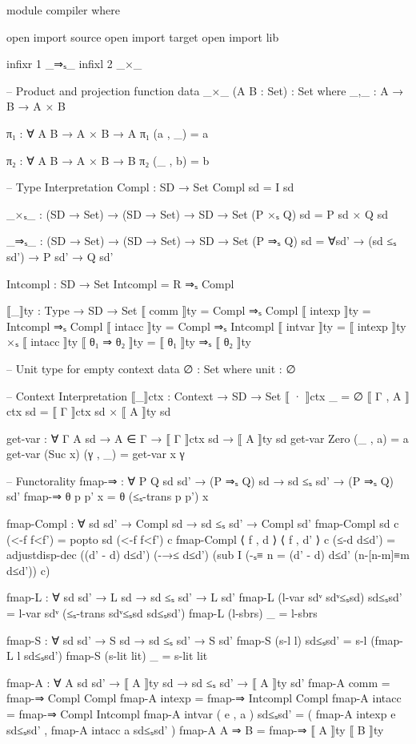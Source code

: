 \documentclass{article}
\begin{document}
\begin{prev}
\begin{code}
module compiler where

open import source
open import target
open import lib


infixr 1 _⇒ₛ_ 
infixl 2 _×_

-- Product and projection function
data _×_ (A B : Set) : Set where
    _,_ : A → B → A × B

π₁ : ∀ {A B} → A × B → A
π₁ (a , _) = a

π₂ : ∀ {A B} → A × B → B
π₂ (_ , b) = b

--  Type Interpretation
Compl : SD → Set
Compl sd = I sd

_×ₛ_ : (SD → Set) → (SD → Set) → SD → Set
(P ×ₛ Q) sd = P sd × Q sd

_⇒ₛ_ : (SD → Set) → (SD → Set) → SD → Set
(P ⇒ₛ Q) sd = ∀{sd'} → (sd ≤ₛ sd') → P sd' → Q sd' 

Intcompl : SD → Set
Intcompl = R ⇒ₛ Compl


⟦_⟧ty : Type → SD → Set
⟦ comm ⟧ty = Compl ⇒ₛ Compl
⟦ intexp ⟧ty = Intcompl ⇒ₛ Compl
⟦ intacc ⟧ty = Compl ⇒ₛ Intcompl
⟦ intvar ⟧ty = ⟦ intexp ⟧ty ×ₛ ⟦ intacc ⟧ty
⟦ θ₁ ⇒ θ₂ ⟧ty = ⟦ θ₁ ⟧ty ⇒ₛ ⟦ θ₂ ⟧ty

-- Unit type for empty context
data ∅ : Set where
    unit : ∅

-- Context Interpretation
⟦_⟧ctx : Context → SD → Set
⟦ · ⟧ctx _ = ∅
⟦ Γ , A ⟧ctx sd = ⟦ Γ ⟧ctx sd × ⟦ A ⟧ty sd

get-var : ∀ {Γ A sd} → A ∈ Γ → ⟦ Γ ⟧ctx sd → ⟦ A ⟧ty sd
get-var Zero     (_ , a) = a
get-var (Suc x) (γ , _) = get-var x γ


-- Functorality
fmap-⇒ : ∀ {P Q sd sd'} → (P ⇒ₛ Q) sd → sd ≤ₛ sd' → (P ⇒ₛ Q) sd'
fmap-⇒ θ p p' x = θ (≤ₛ-trans p p') x

fmap-Compl : ∀ {sd sd'} → Compl sd → sd ≤ₛ sd' → Compl sd'
fmap-Compl {sd} c (<-f f<f') = popto sd (<-f f<f') c
fmap-Compl {⟨ f , d ⟩} {⟨ f , d' ⟩} c (≤-d d≤d') = 
    adjustdisp-dec ((d' - d) d≤d') (-→≤ d≤d') 
        (sub I (-ₛ≡ 
            {n = (d' - d) d≤d'} 
                (n-[n-m]≡m d≤d')) c)

fmap-L : ∀ {sd sd'} → L sd → sd ≤ₛ sd' → L sd'
fmap-L (l-var sdᵛ sdᵛ≤ₛsd) sd≤ₛsd' = l-var sdᵛ (≤ₛ-trans sdᵛ≤ₛsd sd≤ₛsd')
fmap-L (l-sbrs) _ = l-sbrs 

fmap-S : ∀ {sd sd'} → S sd → sd ≤ₛ sd' → S sd'
fmap-S (s-l l) sd≤ₛsd' = s-l (fmap-L l sd≤ₛsd')
fmap-S (s-lit lit) _ = s-lit lit

fmap-A : ∀ {A sd sd'} → ⟦ A ⟧ty sd → sd ≤ₛ sd' → ⟦ A ⟧ty sd'
fmap-A {comm}  = fmap-⇒ {Compl} {Compl}
fmap-A {intexp} = fmap-⇒ {Intcompl} {Compl}
fmap-A {intacc} = fmap-⇒ {Compl} {Intcompl}
fmap-A {intvar} ( e , a ) sd≤ₛsd' = ( fmap-A {intexp} e sd≤ₛsd' , fmap-A {intacc} a sd≤ₛsd' )
fmap-A {A ⇒ B} = fmap-⇒ {⟦ A ⟧ty} {⟦ B ⟧ty}


\end{code}
\end{prev}
\end{document}
